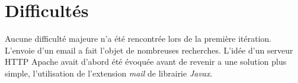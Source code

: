 \section{Difficultés}
Aucune difficulté majeure n'a été rencontrée lors de la première itération. L'envoie d'un email a fait l'objet de nombreuses recherches. L'idée d'un serveur HTTP Apache avait d'abord été évoquée avant de revenir a une solution plus simple, l'utilisation de l'extension \emph{mail} de librairie \emph{Javax}.